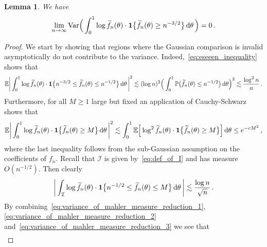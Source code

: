 \documentclass[11pt]{amsart}
\newtheorem{lemma}[theorem]{Lemma}
\theoremstyle{remark}
\theoremstyle{definition}
\newcommand{\bP}{\mathbb P}
\newcommand{\bE}{\mathbb E}
\newcommand{\one}{\boldsymbol{1}}
\begin{document}
    \begin{lemma}
        \label{lemma:mahler_measure_variance_bound}
        We have
        \[
        \lim_{n\to \infty} \text{\normalfont Var}\Big( \int_{0}^1 \log \widetilde{f}_n(\theta) \cdot  \one\big\{ \widetilde f_n(\theta) \ge n^{-3/2}\big\} \, {\rm d}\theta \, \Big) = 0 \, . 
        \]
    \end{lemma}
    \begin{proof}
        We start by showing that regions where the Gaussian comparison is invalid asymptotically do not contribute to the variance. Indeed,~\eqref{eq:eseeen_inequality} shows that
        \begin{equation}
        \label{eq:variance_of_mahler_measure_reduction_1}
            \bE\bigg|\int_{0}^{1} \log \widetilde{f}_n(\theta) \cdot  \one\big\{ n^{-3/2} \le  \widetilde f_n(\theta) \le n^{-1/2}\big\} \, {\rm d}\theta \,  \bigg|^2 \lesssim (\log n)^2 \Big(\int_{0}^1 \bP\big(\widetilde f_n(\theta) \le n^{-1/2}\big) \,  {\rm d}\theta \Big)^2 \lesssim \frac{\log^2 n}{n} \, .
        \end{equation}
        Furthermore, for all $M\ge 1$ large but fixed an application of Cauchy-Schwarz shows that 
        \begin{equation}
            \label{eq:variance_of_mahler_measure_reduction_2}
            \bE\bigg|\int_{0}^{1}\log \widetilde{f}_n(\theta) \cdot  \one\big\{ \widetilde f_n(\theta) \ge M\big\} \, {\rm d}\theta \,  \bigg|^2 \lesssim \int_0^1 \bE\Big[\log^2 \widetilde f_n(\theta) \cdot \one\big\{\widetilde f_n(\theta) \ge M \big\}\Big] \, {\rm d}\theta \le e^{-cM^2} \, ,
        \end{equation}
        where the last inequality follows from the sub-Gaussian assumption on the coefficients of $f_n$. Recall that $\mathcal{I}$ is given by~\eqref{eq:def_of_I} and has measure $O(n^{-1/2})$. Then clearly
        \begin{equation}
            \label{eq:variance_of_mahler_measure_reduction_3}
            \bigg|\int_{\mathcal{I}} \log \widetilde{f}_n(\theta) \cdot  \one\big\{ n^{-1/2} \le  \widetilde f_n(\theta) \le M\big\} \, {\rm d}\theta \,  \bigg| \lesssim \frac{\log n}{\sqrt{n}} \, .
        \end{equation}
        By combining~\eqref{eq:variance_of_mahler_measure_reduction_1}, \eqref{eq:variance_of_mahler_measure_reduction_2} and~\eqref{eq:variance_of_mahler_measure_reduction_3} we see that
        \begin{multline}
        \label{eq:variance_mahler_measure_bound_after_reductions}

\end{multline}
\end{proof}
\end{document}
